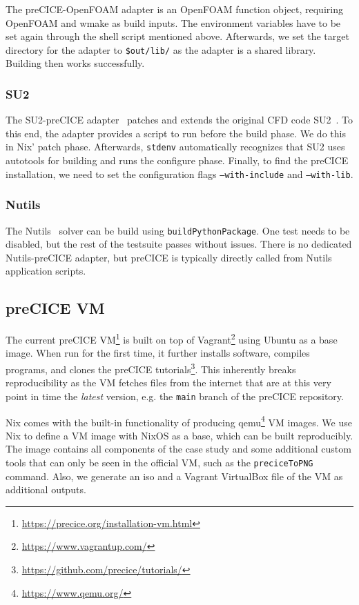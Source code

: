 \documentclass{eceasst}
\begin{document}
The preCICE-OpenFOAM adapter is an OpenFOAM function object, requiring OpenFOAM and wmake as build inputs.
The environment variables have to be set again through the shell script mentioned above.
Afterwards, we set the target directory for the adapter to \texttt{\$out/lib/} as the adapter is a shared library. Building then works successfully.

\subsubsection{SU2}

The SU2-preCICE adapter~\cite{Uekermann2017_Adapters} patches and extends the original CFD code SU2~\cite{su2}.
To this end, the adapter provides a script to run before the build phase.
We do this in Nix' patch phase. Afterwards, \texttt{stdenv} automatically recognizes that SU2 uses autotools for building and runs the configure phase.
Finally, to find the preCICE installation, we need to set the configuration flags \texttt{--with-include} and \texttt{--with-lib}.

\subsubsection{Nutils}

The Nutils~\cite{nutils} solver can be build using \texttt{buildPythonPackage}. One test needs to be disabled, but the rest of the testsuite passes without issues. There is no dedicated Nutils-preCICE adapter, but preCICE is typically directly called from Nutils application scripts. 

\subsection{preCICE VM}

The current preCICE VM\footnote{\url{https://precice.org/installation-vm.html}} is built on top of Vagrant\footnote{\url{https://www.vagrantup.com/}} using Ubuntu as a base image.
When run for the first time, it further installs software, compiles programs, and clones the preCICE tutorials\footnote{\url{https://github.com/precice/tutorials/}}.
This inherently breaks reproducibility as the VM fetches files from the internet that are at this very point in time the \textit{latest} version, e.g. the \texttt{main} branch of the preCICE repository.

Nix comes with the built-in functionality of producing qemu\footnote{\url{https://www.qemu.org/}} VM images.
We use Nix to define a VM image with NixOS as a base, which can be built reproducibly.
The image contains all components of the case study and some additional custom tools that can only be seen in the official VM, such as the \texttt{preciceToPNG} command.
Also, we generate an iso and a Vagrant VirtualBox file of the VM as additional outputs.
\end{document}
